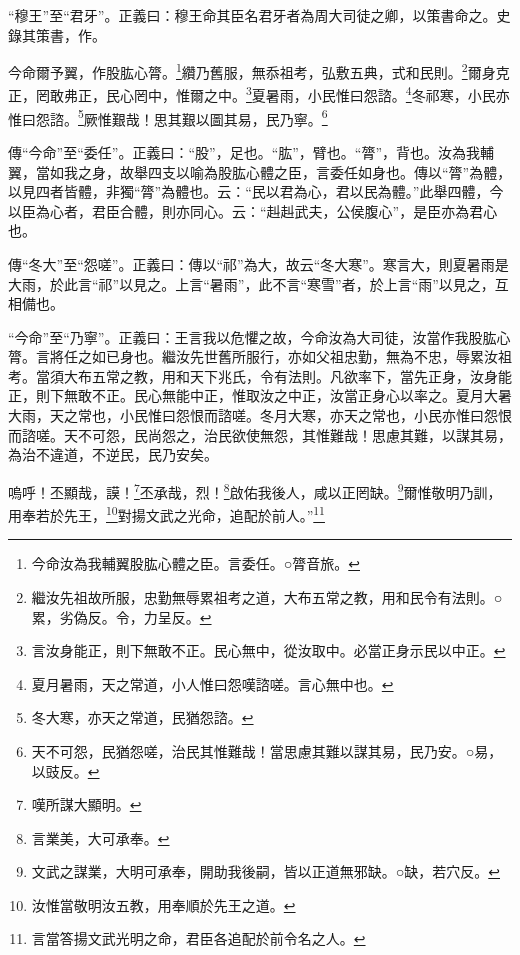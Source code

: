 {\noindent\shu{}\fzkt “穆王”至“君牙”。正義曰：穆王命其臣名君牙者為周大司徒之卿，以策書命之。史錄其策書，作。 \par}

今命爾予翼，作股肱心膂。\footnote{今命汝為我輔翼股肱心體之臣。言委任。○膂音旅。}纘乃舊服，無忝祖考，弘敷五典，式和民則。\footnote{繼汝先祖故所服，忠勤無辱累祖考之道，大布五常之教，用和民令有法則。○累，劣偽反。令，力呈反。}爾身克正，罔敢弗正，民心罔中，惟爾之中。\footnote{言汝身能正，則下無敢不正。民心無中，從汝取中。必當正身示民以中正。}夏暑雨，小民惟曰怨諮。\footnote{夏月暑雨，天之常道，小人惟曰怨嘆諮嗟。言心無中也。}冬祁寒，小民亦惟曰怨諮。\footnote{冬大寒，亦天之常道，民猶怨諮。}厥惟艱哉！思其艱以圖其易，民乃寧。\footnote{天不可怨，民猶怨嗟，治民其惟難哉！當思慮其難以謀其易，民乃安。○易，以豉反。}


{\noindent\zhuan{}\fzbyks 傳“今命”至“委任”。正義曰：“股”，足也。“肱”，臂也。“膂”，背也。汝為我輔翼，當如我之身，故舉四支以喻為股肱心體之臣，言委任如身也。傳以“膂”為體，以見四者皆體，非獨“膂”為體也。云：“民以君為心，君以民為體。”此舉四體，今以臣為心者，君臣合體，則亦同心。云：“赳赳武夫，公侯腹心”，是臣亦為君心也。 \par}

{\noindent\zhuan{}\fzbyks 傳“冬大”至“怨嗟”。正義曰：傳以“祁”為大，故云“冬大寒”。寒言大，則夏暑雨是大雨，於此言“祁”以見之。上言“暑雨”，此不言“寒雪”者，於上言“雨”以見之，互相備也。 \par}

{\noindent\shu{}\fzkt “今命”至“乃寧”。正義曰：王言我以危懼之故，今命汝為大司徒，汝當作我股肱心膂。言將任之如已身也。繼汝先世舊所服行，亦如父祖忠勤，無為不忠，辱累汝祖考。當須大布五常之教，用和天下兆氏，令有法則。凡欲率下，當先正身，汝身能正，則下無敢不正。民心無能中正，惟取汝之中正，汝當正身心以率之。夏月大暑大雨，天之常也，小民惟曰怨恨而諮嗟。冬月大寒，亦天之常也，小民亦惟曰怨恨而諮嗟。天不可怨，民尚怨之，治民欲使無怨，其惟難哉！思慮其難，以謀其易，為治不違道，不逆民，民乃安矣。 \par}

嗚呼！丕顯哉，謨！\footnote{嘆所謀大顯明。}丕承哉，烈！\footnote{言業美，大可承奉。}啟佑我後人，咸以正罔缺。\footnote{文武之謀業，大明可承奉，開助我後嗣，皆以正道無邪缺。○缺，若穴反。}爾惟敬明乃訓，用奉若於先王，\footnote{汝惟當敬明汝五教，用奉順於先王之道。}對揚文武之光命，追配於前人。”\footnote{言當答揚文武光明之命，君臣各追配於前令名之人。}


